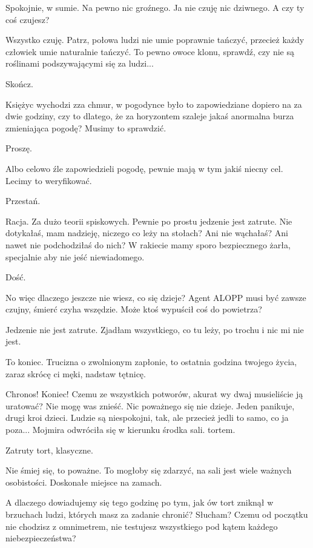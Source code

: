 \ds{} Spokojnie, w sumie. Na pewno nic groźnego. Ja nie czuję nic dziwnego. A czy ty coś czujesz? \de{}

\ds{} Wszystko czuję. Patrz, połowa ludzi nie umie poprawnie tańczyć, przecież każdy człowiek umie naturalnie tańczyć.
To pewno owoce klonu, sprawdź, czy nie są roślinami podszywającymi się za ludzi... \de{}

\ds{} Skończ. \de{}

\ds{} Księżyc wychodzi zza chmur, w pogodynce było to zapowiedziane dopiero na za dwie godziny, czy to dlatego, że za horyzontem szaleje jakaś anormalna burza zmieniająca pogodę? Musimy to sprawdzić. \de{}

\ds{} Proszę. \de{}

\ds{} Albo celowo źle zapowiedzieli pogodę, pewnie mają w tym jakiś niecny cel. Lecimy to weryfikować. \de{}

\ds{} Przestań. \de{}

\ds{} Racja. Za dużo teorii spiskowych. Pewnie po prostu jedzenie jest zatrute. Nie dotykałaś, mam nadzieję, niczego co leży na stołach? Ani nie wąchałaś? Ani nawet nie podchodziłaś do nich?
W rakiecie mamy sporo bezpiecznego żarła, specjalnie aby nie jeść niewiadomego. \de{}

\ds{} Dość. 

\ds{} No więc dlaczego jeszcze nie wiesz, co się dzieje? 
Agent ALOPP musi być zawsze czujny, śmierć czyha wszędzie. Może ktoś wypuścił coś do powietrza? \de{}

\ds{} Jedzenie nie jest zatrute. Zjadłam wszystkiego, co tu leży, po trochu i nic mi nie jest. \de{}

\ds{} To koniec. Trucizna o zwolnionym zapłonie, to ostatnia godzina twojego życia, zaraz skrócę ci męki, nadstaw tętnicę. \de{}

\ds{} Chronos! Koniec! Czemu ze wszystkich potworów, akurat wy dwaj musieliście ją uratować? Nie mogę was znieść. Nic poważnego się nie dzieje. 
Jeden panikuje, drugi kroi dzieci.
Ludzie są niespokojni, tak, ale przecież jedli to samo, co ja poza...
\dm{} Mojmira odwróciła się w kierunku środka sali. \dm{} tortem. \de{}

\ds{} Zatruty tort, klasyczne. \de{}

\ds{} Nie śmiej się, to poważne. To mogłoby się zdarzyć, na sali jest wiele ważnych osobistości. Doskonałe miejsce na zamach. \de{}

\ds{} A dlaczego dowiadujemy się tego godzinę po tym, jak ów tort zniknął w brzuchach ludzi, których masz za zadanie chronić? Słucham? 
Czemu od początku nie chodzisz z omnimetrem, nie testujesz wszystkiego pod kątem każdego niebezpieczeństwa? \de{}

